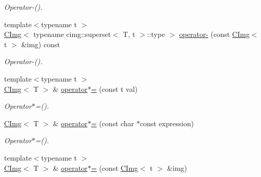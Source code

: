 \begin{DoxyCompactItemize}
\begin{DoxyCompactList}\small\item\em Operator-\/(). \item\end{DoxyCompactList}\item 
\hypertarget{structcimg__library_1_1CImg_a9ca82585632c0c2d11a287e49492387f}{
{\footnotesize template$<$typename t $>$ }\\\hyperlink{structcimg__library_1_1CImg}{CImg}$<$ typename cimg::superset$<$ T, t $>$::type $>$ \hyperlink{structcimg__library_1_1CImg_a9ca82585632c0c2d11a287e49492387f}{operator-\/} (const \hyperlink{structcimg__library_1_1CImg}{CImg}$<$ t $>$ \&img) const }
\label{structcimg__library_1_1CImg_a9ca82585632c0c2d11a287e49492387f}

\begin{DoxyCompactList}\small\item\em Operator-\/(). \item\end{DoxyCompactList}\item 
\hypertarget{structcimg__library_1_1CImg_adf7285a98afaa0cbfeff5b35ef939111}{
{\footnotesize template$<$typename t $>$ }\\\hyperlink{structcimg__library_1_1CImg}{CImg}$<$ T $>$ \& \hyperlink{structcimg__library_1_1CImg_adf7285a98afaa0cbfeff5b35ef939111}{operator$\ast$=} (const t val)}
\label{structcimg__library_1_1CImg_adf7285a98afaa0cbfeff5b35ef939111}

\begin{DoxyCompactList}\small\item\em Operator$\ast$=(). \item\end{DoxyCompactList}\item 
\hypertarget{structcimg__library_1_1CImg_a5403395482bf43eaae6ef0d144b09924}{
\hyperlink{structcimg__library_1_1CImg}{CImg}$<$ T $>$ \& \hyperlink{structcimg__library_1_1CImg_a5403395482bf43eaae6ef0d144b09924}{operator$\ast$=} (const char $\ast$const expression)}
\label{structcimg__library_1_1CImg_a5403395482bf43eaae6ef0d144b09924}

\begin{DoxyCompactList}\small\item\em Operator$\ast$=(). \item\end{DoxyCompactList}\item 
\hypertarget{structcimg__library_1_1CImg_a770aafd607168611eace12d46d5f2bfd}{
{\footnotesize template$<$typename t $>$ }\\\hyperlink{structcimg__library_1_1CImg}{CImg}$<$ T $>$ \& \hyperlink{structcimg__library_1_1CImg_a770aafd607168611eace12d46d5f2bfd}{operator$\ast$=} (const \hyperlink{structcimg__library_1_1CImg}{CImg}$<$ t $>$ \&img)}
\label{structcimg__library_1_1CImg_a770aafd607168611eace12d46d5f2bfd}


\end{DoxyCompactItemize}
